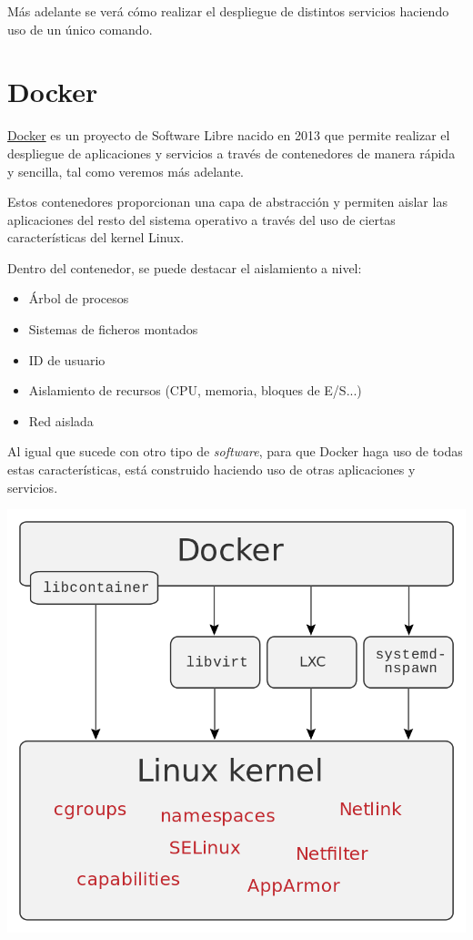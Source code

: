 
Más adelante se verá cómo realizar el despliegue de distintos servicios haciendo uso de un único comando.


\chapter{Docker}

\href{https://www.docker.com/}{Docker} es un proyecto de Software Libre nacido en 2013 que permite realizar el despliegue de aplicaciones y servicios a través de contenedores de manera rápida y sencilla, tal como veremos más adelante.

Estos contenedores proporcionan una capa de abstracción y permiten aislar las aplicaciones del resto del sistema operativo a través del uso de ciertas características del kernel Linux.

Dentro del contenedor, se puede destacar el aislamiento a nivel:

\begin{itemize}
    \item Árbol de procesos
    \item Sistemas de ficheros montados
    \item ID de usuario
    \item Aislamiento de recursos (CPU, memoria, bloques de E/S...)
    \item Red aislada
\end{itemize}

Al igual que sucede con otro tipo de \textit{software},  para que Docker haga uso de todas estas características, está construido haciendo uso de otras aplicaciones y servicios.


\begin{center}
    \includegraphics[width=0.75\linewidth]{img/docker/docker_interfaces.png}
\end{center}

